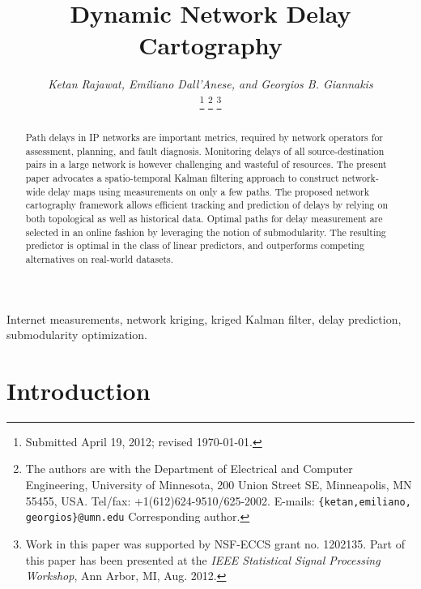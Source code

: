 \documentclass[draftcls,onecolumn,12pt]{IEEEtran}
\theoremstyle{plain}\newtheorem{thm}{Theorem}
\theoremstyle{definition}
\theoremstyle{remark}
\begin{document}
\title{Dynamic Network Delay Cartography}

\author{\emph{Ketan Rajawat, Emiliano Dall'Anese, and Georgios B. Giannakis} 


\thanks{Submitted April 19, 2012; revised \today.}
\thanks{\protect\rule{0pt}{0.5cm}The authors are with the Department of Electrical and Computer Engineering, University of Minnesota, 200 Union Street SE, Minneapolis, MN 55455, USA. Tel/fax: +1(612)624-9510/625-2002. E-mails: {\tt \{ketan,emiliano, georgios\}@umn.edu}
Corresponding author.
}
\thanks{\protect\rule{0pt}{0.5cm}Work in this paper was supported by NSF-ECCS grant no. 1202135. Part of this paper has been presented at the \emph{IEEE Statistical Signal Processing Workshop}, Ann Arbor, MI, Aug. 2012.}
}




\maketitle




\begin{abstract}
Path delays in IP networks are important metrics, required by network operators for assessment, planning, and fault diagnosis.
Monitoring delays of all source-destination pairs in a large network is however challenging and wasteful of resources.
The present paper advocates a spatio-temporal Kalman filtering approach to construct network-wide delay maps using measurements on only a few paths. 
The proposed network cartography framework allows efficient tracking and prediction of delays by relying on both topological as well as historical data.
Optimal paths for delay measurement are selected in an online fashion by leveraging the notion of submodularity.
The resulting predictor is optimal in the class of linear predictors, and outperforms competing alternatives on real-world datasets.
\end{abstract}


\begin{IEEEkeywords}
Internet measurements, network kriging, kriged Kalman filter, delay prediction, submodularity optimization.
\end{IEEEkeywords}

\newpage

\section{Introduction}\label{intro}
\end{document}
